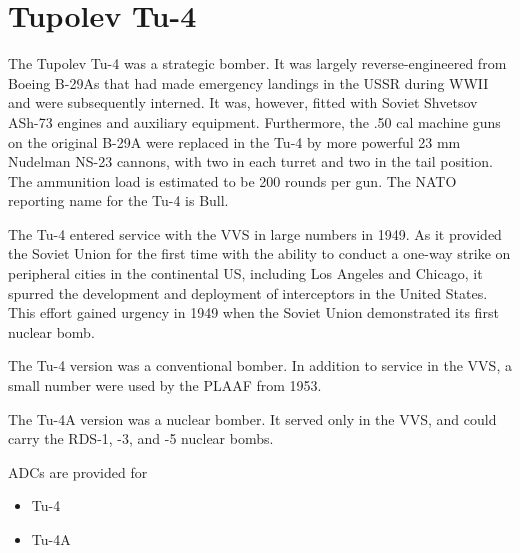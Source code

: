 \section*{Tupolev Tu-4}

The Tupolev Tu-4 was a strategic bomber. It was largely reverse-engineered from Boeing B-29As that had made emergency landings in the USSR during WWII and were subsequently interned. It was, however, fitted with Soviet Shvetsov ASh-73 engines and auxiliary equipment. Furthermore, the .50 cal machine guns on the original B-29A were replaced in the Tu-4 by more powerful 23 mm Nudelman NS-23 cannons, with two in each turret and two in the tail position. The ammunition load is estimated to be 200 rounds per gun. The NATO reporting name for the Tu-4 is Bull.

The Tu-4 entered service with the VVS in large numbers in 1949. As it provided the Soviet Union for the first time with the ability to conduct a one-way strike on peripheral cities in the continental US, including Los Angeles and Chicago, it spurred the development and deployment of interceptors in the United States. This effort gained urgency in 1949 when the Soviet Union demonstrated its first nuclear bomb.

The Tu-4 version was a conventional bomber. In addition to service in the VVS, a small number were used by the PLAAF from 1953.

The Tu-4A version was a nuclear bomber. It served only in the VVS, and could carry the RDS-1, -3, and -5 nuclear bombs.

ADCs are provided for
\begin{itemize}
    \item Tu-4
    \item Tu-4A
\end{itemize}